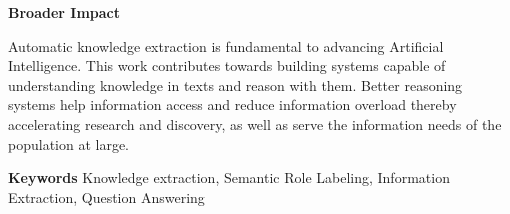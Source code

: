 {\bf Broader Impact}

Automatic knowledge extraction is fundamental to advancing Artificial Intelligence. 
This work contributes towards building systems capable of understanding knowledge in texts and reason with them.
Better reasoning systems help information access and reduce information overload thereby accelerating research and discovery, 
as well as serve the information needs of the population at large.

{\bf Keywords} Knowledge extraction, Semantic Role Labeling, Information Extraction, Question Answering


%	
